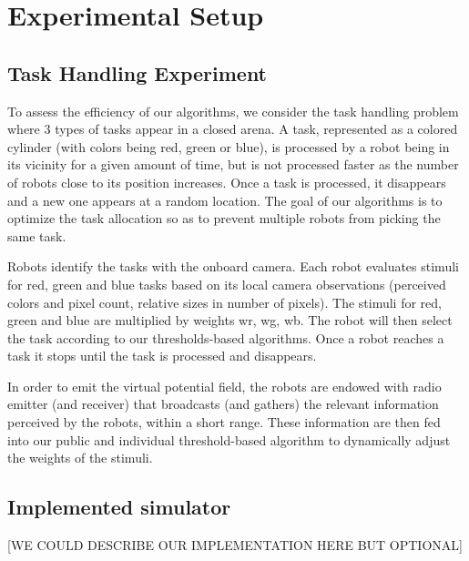 \chapter{Experimental Setup}

\section{Task Handling Experiment}
To assess the efficiency of our algorithms, we consider the task handling problem where 3 types of tasks appear in a closed arena. A task, represented as a colored cylinder (with colors being red, green or blue), is processed by a robot being in its vicinity for a given amount of time, but is not processed faster as the number of robots close to its position increases. Once a task is processed, it disappears and a new one appears at a random location. The goal of our algorithms is to optimize the task allocation so as to prevent multiple robots from picking the same task.

Robots identify the tasks with the onboard camera. Each robot evaluates stimuli for red, green and blue tasks based on its local camera observations (perceived colors and pixel count, relative sizes in number of pixels). The stimuli  for  red,  green  and blue  are  multiplied  by  weights wr,  wg,  wb.  The  robot  will  then select the  task according to our thresholds-based algorithms. Once a  robot reaches  a  task it stops until the task is processed and disappears.

In order to emit the virtual potential field, the robots are endowed with radio emitter (and receiver) that broadcasts (and gathers) the relevant information perceived by the robots, within a short range. These information are then fed into our public and individual threshold-based algorithm to dynamically adjust the weights of the stimuli.

\section{Implemented simulator}
[WE COULD DESCRIBE OUR IMPLEMENTATION HERE BUT OPTIONAL]
